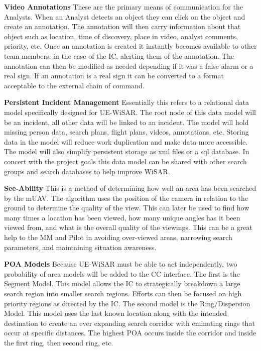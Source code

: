 \textbf{Video Annotations}  These are the primary means of communication for the
Analysts.  When an Analyst detects an object they can click on the object and
create an annotation.  The annotation will then carry information about that
object such as location, time of discovery, place in video, analyst comments,
priority, etc.  Once an annotation is created it instantly becomes
available to other team members, in the case of the IC, alerting them of the
annotation.  The annotation can then be modified as needed depending if it was a
false alarm or a real sign.  If an annotation is a real sign it can be converted
to a format acceptable to the external chain of command.

\textbf{Persistent Incident Management}  Essentially this refers to a relational
data model specifically designed for UE-WiSAR.  The root node of this data model
will be an incident, all other data will be linked to an incident.  The model
will hold missing person data, search plans, flight plans, videos, annotations,
etc.  Storing data in the model will reduce work duplication and make
data more accessible.  The model will also simplify persistent storage as xml
files or a sql database.  In concert with the project goals this data model can
be shared with other search groups and search databases to help improve WiSAR.

\textbf{See-Ability} \cite{engh2008see}  This is a method of determining how
well an area has been searched by the mUAV.  The algorithm uses the position of the
camera in relation to the ground to determine the quality of the view.  This can
later be used to find how many times a location has been viewed, how many unique
angles has it been viewed from, and what is the overall quality of the viewings.
This can be a great help to the MM and Pilot in avoiding over-viewed areas,
narrowing search parameters, and maintaining situation awareness.

\textbf{POA Models} \cite{koester2008lostpersons}  Because UE-WiSAR must
be able to act independently, two probability of area models will be added
to the CC interface.  The first is the Segment Model.  This model allows the IC
to strategically breakdown a large search region into smaller search regions. 
Efforts can then be focused on high priority regions as directed by the IC.  The
second model is the Ring/Dispersion Model.  This model uses the last known
location along with the intended destination to create an ever expanding search
corridor with eminating rings that occur at specific distances.  The
highest POA occurs inside the corridor and inside the first ring, then second
ring, etc.


